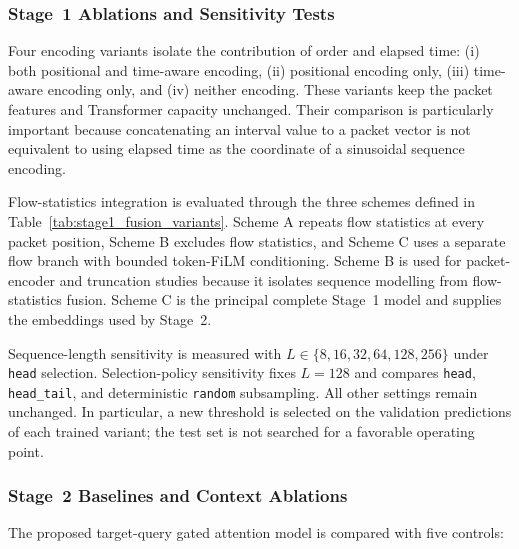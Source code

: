 \subsubsection{Stage~1 Ablations and Sensitivity Tests}
\label{subsubsec:stage1_ablation_protocol}

Four encoding variants isolate the contribution of order and elapsed time:
(i) both positional and time-aware encoding, (ii) positional encoding only,
(iii) time-aware encoding only, and (iv) neither encoding. These variants keep
the packet features and Transformer capacity unchanged. Their comparison is
particularly important because concatenating an interval value to a packet
vector is not equivalent to using elapsed time as the coordinate of a
sinusoidal sequence encoding.

Flow-statistics integration is evaluated through the three schemes defined in
Table~\ref{tab:stage1_fusion_variants}. Scheme A repeats flow statistics at
every packet position, Scheme B excludes flow statistics, and Scheme C uses a
separate flow branch with bounded token-FiLM conditioning. Scheme B is used
for packet-encoder and truncation studies because it isolates sequence
modelling from flow-statistics fusion. Scheme C is the principal complete
Stage~1 model and supplies the embeddings used by Stage~2.

Sequence-length sensitivity is measured with
$L\in\{8,16,32,64,128,256\}$ under \texttt{head} selection. Selection-policy
sensitivity fixes $L=128$ and compares \texttt{head},
\texttt{head\_tail}, and deterministic \texttt{random} subsampling. All other
settings remain unchanged. In particular, a new threshold is selected on the
validation predictions of each trained variant; the test set is not searched
for a favorable operating point.

\subsubsection{Stage~2 Baselines and Context Ablations}
\label{subsubsec:stage2_baseline_protocol}

The proposed target-query gated attention model is compared with five controls:

